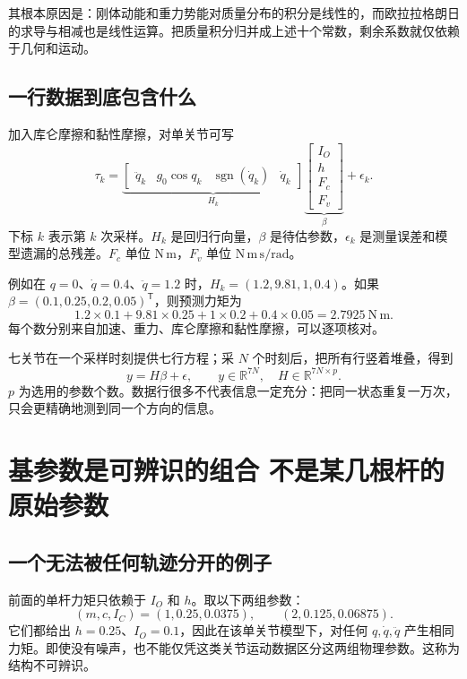 其根本原因是：刚体动能和重力势能对质量分布的积分是线性的，而欧拉拉格朗日的求导与相减也是线性运算。把质量积分归并成上述十个常数，剩余系数就仅依赖于几何和运动。

\subsection{一行数据到底包含什么}
加入库仑摩擦和黏性摩擦，对单关节可写
\begin{equation}\label{eq:single_reg_di}
 \tau_k=\underbrace{\begin{bmatrix}\ddot q_k&g_0\cos q_k&\operatorname{sgn}(\dot q_k)&\dot q_k\end{bmatrix}}_{H_k}
 \underbrace{\begin{bmatrix}I_O\\h\\F_c\\F_v\end{bmatrix}}_{\beta}+\epsilon_k.
\end{equation}
下标 $k$ 表示第 $k$ 次采样。$H_k$ 是回归行向量，$\beta$ 是待估参数，$\epsilon_k$ 是测量误差和模型遗漏的总残差。$F_c$ 单位 $\mathrm{N\,m}$，$F_v$ 单位 $\mathrm{N\,m\,s/rad}$。

例如在 $q=0$、$\dot q=0.4$、$\ddot q=1.2$ 时，$H_k=(1.2,9.81,1,0.4)$。如果 $\beta=(0.1,0.25,0.2,0.05)^{\mathsf T}$，则预测力矩为
\[
 1.2\times0.1+9.81\times0.25+1\times0.2+0.4\times0.05=2.7925\ \mathrm{N\,m}.
\]
每个数分别来自加速、重力、库仑摩擦和黏性摩擦，可以逐项核对。

七关节在一个采样时刻提供七行方程；采 $N$ 个时刻后，把所有行竖着堆叠，得到
\begin{equation}
 y=H\beta+\epsilon,\qquad y\in\mathbb R^{7N},\quad H\in\mathbb R^{7N\times p}.
\end{equation}
$p$ 为选用的参数个数。数据行很多不代表信息一定充分：把同一状态重复一万次，只会更精确地测到同一个方向的信息。

\section{基参数是可辨识的组合 不是某几根杆的原始参数}
\subsection{一个无法被任何轨迹分开的例子}
前面的单杆力矩只依赖于 $I_O$ 和 $h$。取以下两组参数：
\[
 (m,c,I_C)=(1,0.25,0.0375),\qquad(2,0.125,0.06875).
\]
它们都给出 $h=0.25$、$I_O=0.1$，因此在该单关节模型下，对任何 $q,\dot q,\ddot q$ 产生相同力矩。即使没有噪声，也不能仅凭这类关节运动数据区分这两组物理参数。这称为结构不可辨识。

